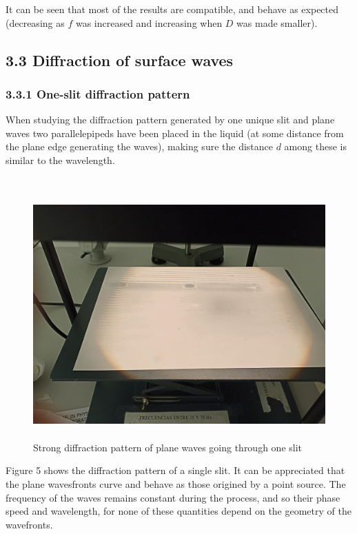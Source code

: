 \documentclass[a4paper, 12pt]{article}
\begin{document}
It can be seen that most of the results are compatible, and behave as expected (decreasing as $f$ was increased and increasing when $D$ was made smaller).
	\subsection{3.3 Diffraction of surface waves}	
	\subsubsection{3.3.1 One-slit diffraction pattern}
	When studying the diffraction pattern generated by one unique slit and plane waves two parallelepipeds have been placed in the liquid (at some distance from the plane edge generating the waves), making sure the distance $d$ among these is similar to the wavelength.\\\
	\begin{figure}[hbt!]
		\centering
		\includegraphics[height=9.5cm]{1slit}
		\caption{Strong diffraction pattern of plane waves going through one slit}
	\end{figure}

	Figure 5 shows the diffraction pattern of a single slit. It can be appreciated that the plane wavesfronts curve and behave as those origined by a point source. The frequency of the waves remains constant during the process, and so their phase speed and wavelength, for none of these quantities depend on the geometry of the wavefronts. \\
	
\end{document}
